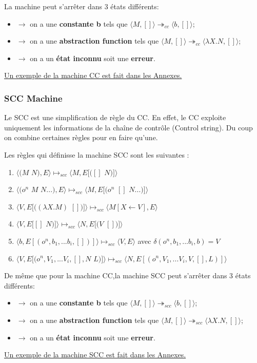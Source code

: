 \documentclass[10pt,a4paper]{article}
\begin{document}
					La machine peut s'arrêter dans 3 états différents:
					\begin{itemize}
						\item[]$\longrightarrow$ on a une \textbf{constante b} tels que $\langle M,[]\rangle \twoheadrightarrow_{cc} \langle b,[]\rangle$;
						\item[]$\longrightarrow$ on a une \textbf{abstraction function} tels que $\langle M,[]\rangle \twoheadrightarrow_{cc} \langle\lambda X.N,[]\rangle$;
						\item[]$\longrightarrow$ on a un \textbf{état inconnu} soit une \textbf{erreur}.
					\end{itemize}
					\hyperref[CC]{Un exemple de la machine CC est fait dans les Annexes.}
					\bigbreak
					
					
				\subsubsection{SCC Machine}
					Le SCC est une simplification de règle du CC. En effet, le CC exploite uniquement les informations de la chaîne de contrôle (Control string). Du coup on combine certaines règles pour en faire qu'une.
					\bigbreak
					
					Les règles qui définisse la machine SCC sont les suivantes :
					
					\begin{enumerate}
							\item $\langle(M$ $N),E\rangle \longmapsto_{scc} \langle M,E[([]$ $N)]\rangle$
							\item $\langle(o^{n}$ $M$ $N...),E\rangle \longmapsto_{scc} \langle M,E[(o^{n}$ $[]$ $N...)]\rangle$
							\item $\langle V,E[((\lambda X.M)$ $[])]\rangle \longmapsto_{scc} \langle M[X\leftarrow V],E\rangle$
							\item $\langle V,E[[]$ $N)]\rangle \longmapsto_{scc} \langle N,E[(V$ $[])]\rangle$
							\item $\langle b,E[(o^{n},b_{1},...b_{i},[])]\rangle \longmapsto_{scc} \langle V,E\rangle$ avec $\delta (o^{n},b_{1},...b_{i},b)=V$ 
							\item $\langle V,E[(o^{n},V_{1},...V_{i},[],N$ $L)]\rangle \longmapsto_{scc} \langle N,E[(o^{n},V_{1},...V_{i},V,[],L)]\rangle$
					\end{enumerate}
					\bigbreak
					
					De même que pour la machine CC,la machine SCC peut s'arrêter dans 3 états différents:
					\begin{itemize}
						\item[]$\longrightarrow$ on a une \textbf{constante b} tels que $\langle M,[]\rangle \twoheadrightarrow_{scc} \langle b,[]\rangle$;
						\item[]$\longrightarrow$ on a une \textbf{abstraction function} tels que $\langle M,[]\rangle \twoheadrightarrow_{scc} \langle\lambda X.N,[]\rangle$;
						\item[]$\longrightarrow$ on a un \textbf{état inconnu} soit une \textbf{erreur}.
					\end{itemize}
					\bigbreak
					\hyperref[SCC]{Un exemple de la machine SCC est fait dans les Annexes.}
					\newpage
\end{document}
